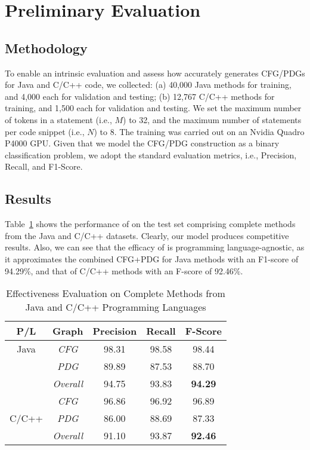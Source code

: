 \section{Preliminary Evaluation}
\subsection{Methodology}
To enable an intrinsic evaluation and assess how accurately \tool generates CFG/PDGs for Java and C/C++ code, we collected: (a) 40,000 Java methods for training, and 4,000 each for validation and testing; (b) 12,767 C/C++ methods for training, and 1,500 each for validation and testing. We set the maximum number of tokens in a statement (i.e., $M$) to 32, and the maximum number of statements per code snippet (i.e., $N$) to 8. The training was carried out on an Nvidia Quadro P4000 GPU. Given that we model the CFG/PDG construction as a binary classification problem, we adopt the standard evaluation metrics, i.e., Precision, Recall, and F1-Score. 

\subsection{Results}

Table~\ref{tab:intrinsic} shows the performance of \tool on the test set comprising complete methods from the Java and C/C++ datasets. Clearly, our model produces competitive results. Also, we can see that the efficacy of \tool is programming language-agnostic, as it approximates the combined CFG+PDG
for Java methods with an F1-score of 94.29\%, and that of C/C++ methods with an F-score of 92.46\%.

\begin{table}[H]
  \centering
  \small
  \caption{Effectiveness Evaluation on Complete Methods from Java and C/C++ Programming Languages}
\begin{tabular}{c|c|c|c|c}
\hline
\textbf{P/L}         & \textbf{Graph}   & \textbf{Precision} & \textbf{Recall} & \textbf{F-Score} \\ \hline
Java                 & \textit{CFG}     & 98.31              & 98.58           & 98.44            \\
                     & \textit{PDG}     & 89.89              & 87.53           & 88.70            \\
                     & \textit{Overall} & 94.75            & 93.83           & \textbf{94.29}   \\
\hline
\multirow{3}{*}{C/C++} & \textit{CFG}     & 96.86            & 96.92         & 96.89           \\
                     & \textit{PDG}     & 86.00            & 88.69         & 87.33           \\
                     & \textit{Overall} & 91.10            & 93.87         & \textbf{92.46}  \\
\hline
\end{tabular}
\label{tab:intrinsic}
\end{table}
